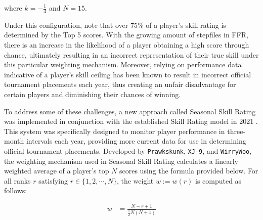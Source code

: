 

where $k = - \frac{1}{4}$ and $N = 15$.

\vspace{2mm}

Under this configuration, note that over 75\% of a player's skill rating is determined by the Top 5 scores. With the growing amount of stepfiles in FFR, there is an increase in the likelihood of a player obtaining a high score through chance, ultimately resulting in an incorrect representation of their true skill under this particular weighting mechanism. Moreover, relying on performance data indicative of a player's skill ceiling has been known to result in incorrect official tournament placements each year, thus creating an unfair disadvantage for certain players and diminishing their chances of winning.

\vspace{2mm}

To address some of these challenges, a new approach called Seasonal Skill Rating was implemented in conjunction with the established Skill Rating model in 2021 \cite{20211001}. This system was specifically designed to monitor player performance in three-month intervals each year, providing more current data for use in determining official tournament placements. Developed by \texttt{Prawkskunk}, \texttt{XJ-9}, and \texttt{WirryWoo}, the weighting mechanism used in Seasonal Skill Rating calculates a linearly weighted average of a player's top $N$ scores using the formula provided below. For all ranks $r$ satisfying $r \in \{1, 2, \cdots, N\}$, the weight $w := w(r)$ is computed as follows:

\begin{align*}
	w & = \frac{N - r + 1}{\frac{1}{2}N (N + 1)} 
\end{align*}


